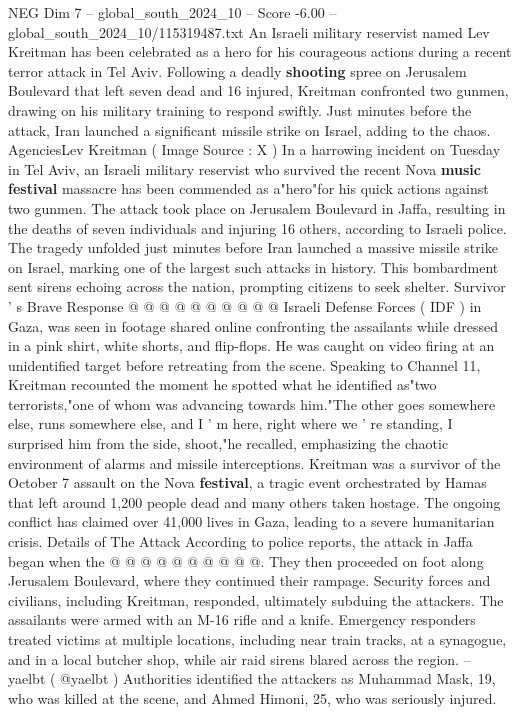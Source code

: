 \begin{textsample}{NEG Dim 7 – global\_south\_2024\_10 – Score -6.00 – global\_south\_2024\_10/115319487.txt}  \label{ex:f7_neg_250}
An Israeli military reservist named Lev Kreitman has been celebrated as a hero for his courageous actions during a recent terror attack in Tel Aviv.
Following a deadly \textbf{shooting} spree on Jerusalem Boulevard that left seven dead and 16 injured, Kreitman confronted two gunmen, drawing on his military training to respond swiftly.
Just minutes before the attack, Iran launched a significant missile strike on Israel, adding to the chaos.
AgenciesLev Kreitman ( Image Source : X ) In a harrowing incident on Tuesday in Tel Aviv, an Israeli military reservist who survived the recent Nova \textbf{music} \textbf{festival} massacre has been commended as a"hero"for his quick actions against two gunmen.
The attack took place on Jerusalem Boulevard in Jaffa, resulting in the deaths of seven individuals and injuring 16 others, according to Israeli police.
The tragedy unfolded just minutes before Iran launched a massive missile strike on Israel, marking one of the largest such attacks in history.
This bombardment sent sirens echoing across the nation, prompting citizens to seek shelter.
Survivor ' s Brave Response @ @ @ @ @ @ @ @ @ @ Israeli Defense Forces ( IDF ) in Gaza, was seen in footage shared online confronting the assailants while dressed in a pink shirt, white shorts, and flip-flops.
He was caught on video firing at an unidentified target before retreating from the scene.
Speaking to Channel 11, Kreitman recounted the moment he spotted what he identified as"two terrorists,"one of whom was advancing towards him."The other goes somewhere else, runs somewhere else, and I ' m here, right where we ' re standing, I surprised him from the side, shoot,"he recalled, emphasizing the chaotic environment of alarms and missile interceptions.
Kreitman was a survivor of the October 7 assault on the Nova \textbf{festival}, a tragic event orchestrated by Hamas that left around 1,200 people dead and many others taken hostage.
The ongoing conflict has claimed over 41,000 lives in Gaza, leading to a severe humanitarian crisis.
Details of The Attack According to police reports, the attack in Jaffa began when the @ @ @ @ @ @ @ @ @ @.
They then proceeded on foot along Jerusalem Boulevard, where they continued their rampage.
Security forces and civilians, including Kreitman, responded, ultimately subduing the attackers.
The assailants were armed with an M-16 rifle and a knife.
Emergency responders treated victims at multiple locations, including near train tracks, at a synagogue, and in a local butcher shop, while air raid sirens blared across the region. -- yaelbt ( @yaelbt ) Authorities identified the attackers as Muhammad Mask, 19, who was killed at the scene, and Ahmed Himoni, 25, who was seriously injured.

\end{textsample}
